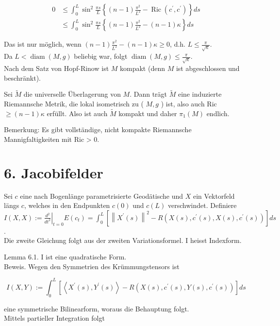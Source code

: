 \documentclass[10pt]{article}
\begin{document}
$$
\begin{aligned}
0 & \leq \int_{0}^{L} \sin ^{2} \frac{\pi s}{L}\left\{(n-1) \frac{\pi^{2}}{L^{2}}-\operatorname{Ric}\left(c^{\prime}, c^{\prime}\right)\right\} d s \\
& \leq \int_{0}^{L} \sin ^{2} \frac{\pi s}{L}\left\{(n-1) \frac{\pi^{2}}{L^{2}}-(n-1) \kappa\right\} d s
\end{aligned}
$$

Das ist nur möglich, wenn $(n-1) \frac{\pi^{2}}{L^{2}}-(n-1) \kappa \geq 0$, d.h. $L \leq \frac{\pi}{\sqrt{\kappa}}$.\\
Da $L<\operatorname{diam}(M, g)$ beliebig war, folgt $\operatorname{diam}(M, g) \leq \frac{\pi}{\sqrt{\kappa}}$.\\
Nach dem Satz von Hopf-Rinow ist $M$ kompakt (denn $M$ ist abgeschlossen und beschränkt).

Sei $\tilde{M}$ die universelle Überlagerung von $M$. Dann trägt $\tilde{M}$ eine induzierte Riemannsche Metrik, die lokal isometrisch zu ( $M, g$ ) ist, also auch Ric $\geq(n-1) \kappa$ erfüllt. Also ist auch $\tilde{M}$ kompakt und daher $\pi_{1}(M)$ endlich.

Bemerkung: Es gibt vollständige, nicht kompakte Riemannsche Mannigfaltigkeiten mit Ric > 0.

\section*{6. Jacobifelder}
Sei $c$ eine nach Bogenlänge parametrisierte Geodätische und $X$ ein Vektorfeld längs $c$, welches in den Endpunkten $c(0)$ und $c(L)$ verschwindet. Definiere\\
$I(X, X):=\left.\frac{d^{2}}{d t^{2}}\right|_{t=0} E\left(c_{t}\right)=\int_{0}^{L}\left[\left\|X^{\prime}(s)\right\|^{2}-R\left(X(s), c^{\prime}(s), X(s), c^{\prime}(s)\right)\right] d s$.\\
Die zweite Gleichung folgt aus der zweiten Variationsformel. I heisst Indexform.

Lemma 6.1. I ist eine quadratische Form.\\
Beweis. Wegen den Symmetrien des Krümmungstensors ist


\begin{equation*}
I(X, Y):=\int_{0}^{L}\left[\left\langle X^{\prime}(s), Y^{\prime}(s)\right\rangle-R\left(X(s), c^{\prime}(s), Y(s), c^{\prime}(s)\right)\right] d s \tag{6}
\end{equation*}


eine symmetrische Bilinearform, woraus die Behauptung folgt.\\
Mittels partieller Integration folgt
\end{document}
